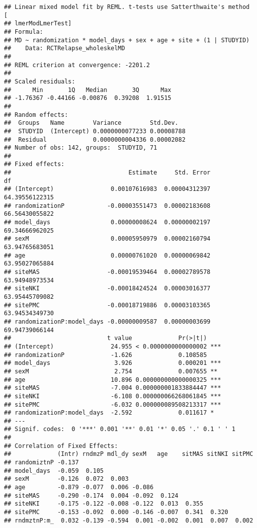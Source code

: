 \documentclass[]{article}
\theoremstyle{definition}
\theoremstyle{definition}
\theoremstyle{definition}
\theoremstyle{remark}
\begin{document}
\begin{verbatim}
## Linear mixed model fit by REML. t-tests use Satterthwaite's method [
## lmerModLmerTest]
## Formula: 
## MD ~ randomization * model_days + sex + age + site + (1 | STUDYID)
##    Data: RCTRelapse_wholeskelMD
## 
## REML criterion at convergence: -2201.2
## 
## Scaled residuals: 
##      Min       1Q   Median       3Q      Max 
## -1.76367 -0.44166 -0.00876  0.39208  1.91515 
## 
## Random effects:
##  Groups   Name        Variance        Std.Dev.  
##  STUDYID  (Intercept) 0.0000000077233 0.00008788
##  Residual             0.0000000004336 0.00002082
## Number of obs: 142, groups:  STUDYID, 71
## 
## Fixed effects:
##                                 Estimate     Std. Error             df
## (Intercept)                0.00107616983  0.00004312397 64.39556122315
## randomizationP            -0.00003551473  0.00002183608 66.56430055822
## model_days                 0.00000008624  0.00000002197 69.34666962025
## sexM                       0.00005950979  0.00002160794 63.94765683051
## age                        0.00000761020  0.00000069842 63.95027065884
## siteMAS                   -0.00019539464  0.00002789578 63.94948973534
## siteNKI                   -0.00018424524  0.00003016377 63.95445709082
## sitePMC                   -0.00018719886  0.00003103365 63.94534349730
## randomizationP:model_days -0.00000009587  0.00000003699 69.94739066144
##                           t value             Pr(>|t|)    
## (Intercept)                24.955 < 0.0000000000000002 ***
## randomizationP             -1.626             0.108585    
## model_days                  3.926             0.000201 ***
## sexM                        2.754             0.007655 ** 
## age                        10.896 0.000000000000000325 ***
## siteMAS                    -7.004 0.000000001833884447 ***
## siteNKI                    -6.108 0.000000066268061845 ***
## sitePMC                    -6.032 0.000000089508213317 ***
## randomizationP:model_days  -2.592             0.011617 *  
## ---
## Signif. codes:  0 '***' 0.001 '**' 0.01 '*' 0.05 '.' 0.1 ' ' 1
## 
## Correlation of Fixed Effects:
##             (Intr) rndmzP mdl_dy sexM   age    sitMAS sitNKI sitPMC
## randomiztnP -0.137                                                 
## model_days  -0.059  0.105                                          
## sexM        -0.126  0.072  0.003                                   
## age         -0.879 -0.077  0.006 -0.086                            
## siteMAS     -0.290 -0.174  0.004 -0.092  0.124                     
## siteNKI     -0.175 -0.122 -0.008 -0.122  0.013  0.355              
## sitePMC     -0.153 -0.092  0.000 -0.146 -0.007  0.341  0.320       
## rndmztnP:m_  0.032 -0.139 -0.594  0.001 -0.002  0.001  0.007  0.002
\end{verbatim}
\end{document}
